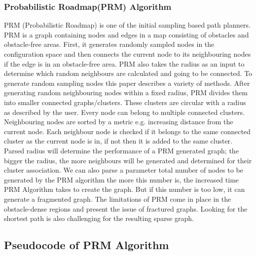 \documentclass[9pt,a4paper,twoside]{rho-class/rho}
\begin{document}
            \subsubsection{Probabilistic Roadmap(PRM) Algorithm}
            PRM (Probabilistic Roadmap) is one of the initial sampling based path planners. PRM is a graph containing nodes and edges in a map consisting of obstacles and obstacle-free areas. First, it generates randomly sampled nodes in the configuration space and then connects the current node to its neighbouring nodes if the edge is in an obstacle-free area. PRM also takes the radius as an input to determine which random neighbours are calculated and going to be connected. To generate random sampling nodes this paper describes a variety of methods. After generating random neighbouring nodes within a fixed radius, PRM divides them into smaller connected graphs/clusters. These clusters are circular with a radius as described by the user. Every node can belong to multiple connected clusters. Neighbouring nodes are sorted by a metric e.g. increasing distance from the current node. Each neighbour node is checked if it belongs to the same connected cluster as the current node is in, if not then it is added to the same cluster. Parsed radius will determine the performance of a PRM generated graph; the bigger the radius, the more neighbours will be generated and determined for their cluster association. We can also parse a parameter total number of nodes to be generated by the PRM algorithm the more this number is, the increased time PRM Algorithm takes to create the graph. But if this number is too low, it can generate a fragmented graph. The limitations of PRM come in place in the obstacle-dense regions and present the issue of fractured graphs. Looking for the shortest path is also challenging for the resulting sparse graph.

            \subsection{Pseudocode of PRM Algorithm}

            \nolinenumbers
            
            \linenumbers
    
\end{document}
